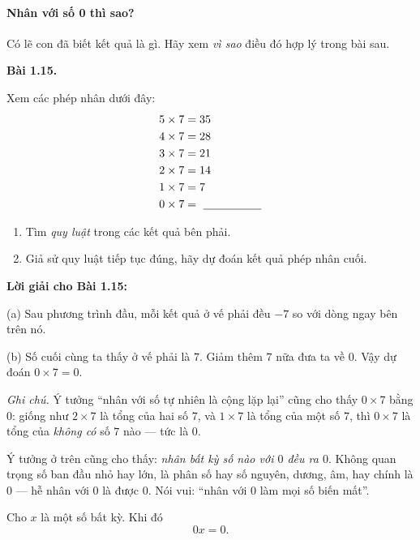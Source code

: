 \documentclass[14pt,a4paper]{extbook}
\newenvironment{problem}[1][]{
  \par\noindent\textbf{Bài #1.}\ \ignorespaces
}{\par}
\begin{document}
\paragraph{Nhân với số 0 thì sao?}
Có lẽ con đã biết kết quả là gì. Hãy xem \emph{vì sao} điều đó hợp lý
trong bài sau.

\begin{problem}[1.15]
Xem các phép nhân dưới đây:
\[
\begin{aligned}
5\times7 &= 35\\
4\times7 &= 28\\
3\times7 &= 21\\
2\times7 &= 14\\
1\times7 &= 7\\
0\times7 &=\ \underline{\hspace{1.8cm}}
\end{aligned}
\]
\begin{enumerate}[label=(\alph*)]
  \item Tìm \emph{quy luật} trong các kết quả bên phải.
  \item Giả sử quy luật tiếp tục đúng, hãy dự đoán kết quả phép nhân cuối.
\end{enumerate}
\end{problem}

\noindent\textbf{Lời giải cho Bài 1.15:}

\noindent(a)\; Sau phương trình đầu, mỗi kết quả ở vế phải đều \(-7\)
so với dòng ngay bên trên nó.

\smallskip
\noindent(b)\; Số cuối cùng ta thấy ở vế phải là \(7\).
Giảm thêm \(7\) nữa đưa ta về \(0\).
Vậy dự đoán \(0\times7=0\).

\medskip
\noindent\textit{Ghi chú.} Ý tưởng “nhân với số tự nhiên là cộng lặp lại”
cũng cho thấy \(0\times7\) bằng \(0\): giống như \(2\times7\) là tổng của
hai số \(7\), và \(1\times7\) là tổng của một số \(7\), thì \(0\times7\)
là tổng của \emph{không có} số \(7\) nào — tức là \(0\).


Ý tưởng ở trên cũng cho thấy: \emph{nhân bất kỳ số nào với \(0\) đều ra \(0\)}.
Không quan trọng số ban đầu nhỏ hay lớn, là phân số hay số nguyên, dương,
âm, hay chính là \(0\) — hễ nhân với \(0\) là được \(0\). Nói vui: “nhân
với \(0\) làm mọi số biến mất”.

\begin{tcolorbox}[colback=yellow!10, colframe=orange!80!black,
title={Quan trọng: Nhân với số 0}]
Cho \(x\) là một số bất kỳ. Khi đó
\[
0x = 0.
\]
\end{tcolorbox}
\end{document}
